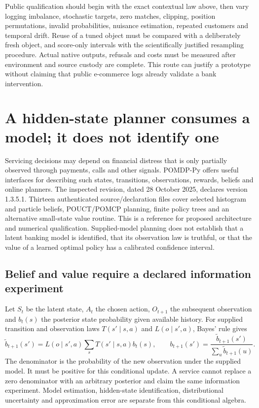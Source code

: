 Public qualification should begin with the exact contextual law above, then
vary logging imbalance, stochastic targets, zero matches, clipping, position
permutations, invalid probabilities, nuisance estimation, repeated customers
and temporal drift. Reuse of a tuned object must be compared with a deliberately
fresh object, and score-only intervals with the scientifically justified
resampling procedure. Actual native outputs, refusals and costs must be
measured after environment and source custody are complete. This route can
justify a prototype without claiming that public e-commerce logs already
validate a bank intervention.


\section{A hidden-state planner consumes a model; it does not identify one}
\label{exec23:pomdppy-scope}
Servicing decisions may depend on financial distress that is only partially
observed through payments, calls and other signals. POMDP-Py offers useful
interfaces for describing such states, transitions, observations, rewards,
beliefs and online planners. The inspected revision, dated 28 October 2025,
declares version 1.3.5.1. Thirteen authenticated source/declaration files cover
selected histogram and particle beliefs, POUCT/POMCP planning, finite policy
trees and an alternative small-state value routine. This is a reference for
proposed architecture and numerical qualification. Supplied-model planning
does not establish that a latent banking model is identified, that its observation
law is truthful, or that the value of a learned optimal policy has a calibrated
confidence interval. \citep{exec23_pomdppy_sources}

\subsection{Belief and value require a declared information experiment}
\label{exec23:pomdppy-belief}
Let $S_t$ be the latent state, $A_t$ the chosen action, $O_{t+1}$ the subsequent
observation and $b_t(s)$ the posterior state probability given available
history. For supplied transition and observation laws $T(s'\mid s,a)$ and
$L(o\mid s',a)$, Bayes' rule gives
\[
 \widetilde b_{t+1}(s')=L(o\mid s',a)\sum_sT(s'\mid s,a)b_t(s),
 \qquad b_{t+1}(s')=\frac{\widetilde b_{t+1}(s')}
 {\sum_u\widetilde b_{t+1}(u)}.
\]
The denominator is the probability of the new observation under the supplied
model. It must be positive for this conditional update. A service cannot
replace a zero denominator with an arbitrary posterior and claim the same
information experiment. Model estimation, hidden-state identification,
distributional uncertainty and approximation error are separate from this
conditional algebra.

